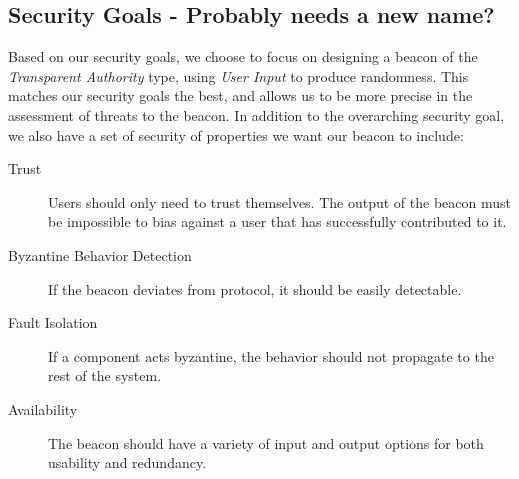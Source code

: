 \subsection{Security Goals - Probably needs a new name?}

Based on our security goals, we choose to focus on designing a beacon of the \emph{Transparent Authority} type, using \emph{User Input} to produce randomness. This matches our security goals the best, and allows us to be more precise in the assessment of threats to the beacon. In addition to the overarching security goal, we also have a set of security of properties we want our beacon to include:

\begin{description}
	\item [Trust] Users should only need to trust themselves. The output of the beacon must be impossible to bias against a user that has successfully contributed to it. 
    \item [Byzantine Behavior Detection] If the beacon deviates from protocol, it should be easily detectable.
    \item [Fault Isolation] If a component acts byzantine, the behavior should not propagate to the rest of the system.
    \item [Availability] The beacon should have a variety of input and output options for both usability and redundancy. 
\end{description}
